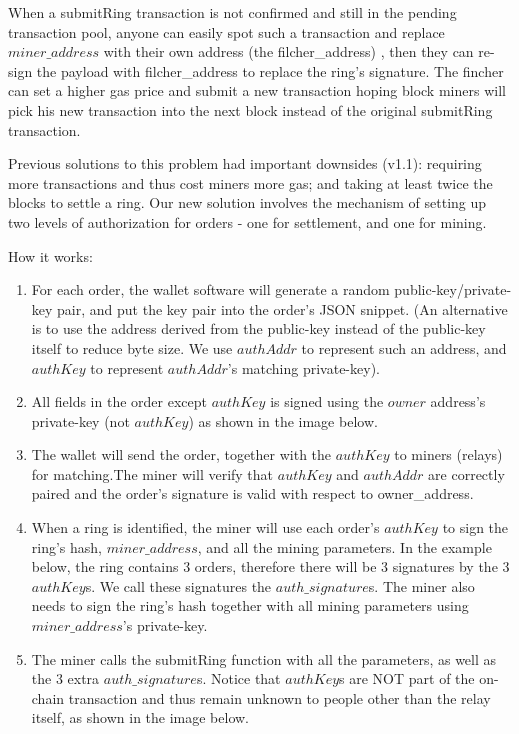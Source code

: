 \documentclass[UTF8,nofonts]{article}
\begin{document}
\begin{multicols}{2}
When a submitRing transaction is not confirmed and still in the pending transaction pool, anyone can easily spot such a transaction and replace $miner\_address$ with their own address (the filcher\_address) , then they can re-sign the payload with filcher\_address to replace the ring's signature. The fincher can set a higher gas price and submit a new transaction hoping block miners will pick his new transaction into the next block instead of the original submitRing transaction.

Previous solutions to this problem had important downsides (v1.1): requiring more transactions and thus cost miners more gas; and taking at least twice the blocks to settle a ring.  Our new solution involves the mechanism of setting up two levels of authorization for orders - one for settlement, and one for mining.

How it works:

\begin{enumerate}

	\item For each order, the wallet software will generate a random public-key/private-key pair, and put the key pair into the order's JSON snippet. (An alternative is to use the address derived from the public-key instead of the public-key itself to reduce byte size. We use $authAddr$ to represent such an address, and $authKey$ to represent $authAddr$'s matching private-key).

	\item All fields in the order except $authKey$ is signed using the $owner$ address's private-key (not $authKey$) as shown in the image below.

	\item The wallet will send the order, together with the $authKey$ to miners (relays) for matching.The miner will verify that $authKey$ and $authAddr$ are correctly paired and the order's signature is valid with respect to owner\_address.

	\item When a ring is identified, the miner will use each order's $authKey$ to sign the ring's hash, $miner\_address$, and all the mining parameters. In the example below, the ring contains 3 orders, therefore there will be 3 signatures by the 3 $authKey$s. We call these signatures the $auth\_signature$s. The miner also needs to sign the ring's hash together with all mining parameters using $miner\_address$'s private-key.

	\item The miner calls the submitRing function with all the parameters, as well as the 3 extra $auth\_signature$s. Notice that $authKey$s are NOT part of the on-chain transaction and thus remain unknown to people other than the relay itself, as shown in the image below.


\end{enumerate}
\end{multicols}
\end{document}
